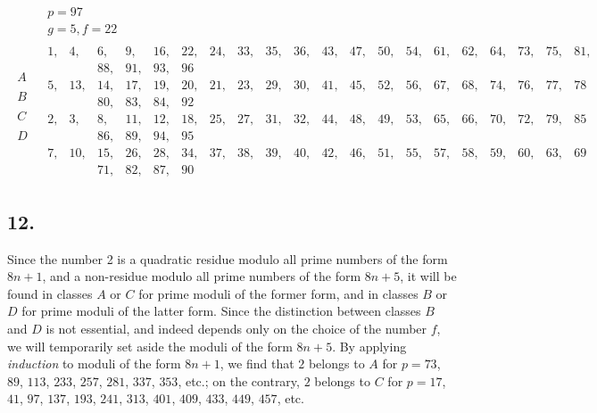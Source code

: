 \documentclass[twoside,12pt]{memoir}
\begin{document}
%
\[\begin{aligned}
& \begin{array}{c} p=97 \\  g=5, f=22 \end{array} \\
\begin{array}{l} A \\  \\ B \\ \\ C \\ \\ D \\ \\ \end{array} & 
\begin{array}{|rrrrrrrrrrrrrrrrrrrrrr} 
1,&4,&6,&9,&16,&22,&24,&33,&35,&36,&43,&47,&50,&54,&61,&62,&64,&73,&75,&81,\\
&&88,&91,&93,&96 \\ 
5,&13,&14,& 17,&19,&20,&21,&23,&29,&30,&41,&45,&52,&56,&67,&68,&74,&76,&77,&78 \\ 
&&80,&83,&84,&92 \\
2,& 3,& 8,&11,&12,&18,&25,&27,&31,&32,&44,&48,&49,&53,&65,&66,&70,&72,&79,&85 \\ 
&&86,&89,&94,&95\\
7,&10,&15,&26,&28,&34,& 37,&38,&39,&40,&42,&46,&51,&55,&57,&58,&59,&60,&63,&69 \\
&&71,&82,&87,&90
\end{array} 
\end{aligned}\]
%

\subsection*{12.}
 
Since the number 2 is a quadratic residue modulo all prime numbers of the form \(8n+1\), and a non-residue modulo all prime numbers of the form \(8n+5\), it will be found in classes \(A\) or \(C\) for prime moduli of the former form, and in classes \(B\) or \(D\) for prime moduli of the latter form. Since the distinction between classes \(B\) and \(D\) is not essential, and indeed depends only on the choice of the number \(f\), we will temporarily set aside the moduli of the form \(8n+5\). By applying \textit{induction} to moduli of the form \(8n+1\), we find that \(2\) belongs to \(A\) for \(p=73\), \(89\), \(113\), \(233\), \(257\), \(281\), \(337\), \(353\), etc{.}; on the contrary, \(2\) belongs to \(C\) for \(p=17\), \(41\), \(97\), \(137\), \(193\), \(241\), \(313\), \(401\), \(409\), \(433\), \(449\), \(457\), etc{.}
 
\end{document}
